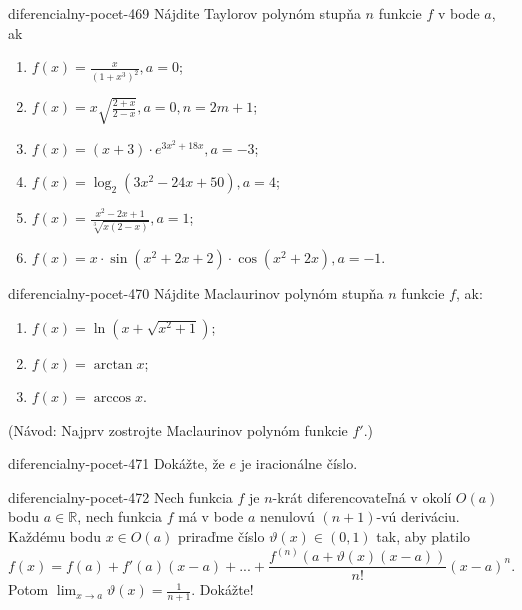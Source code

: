 \begin{defproblem}{diferencialny-pocet-469}
Nájdite Taylorov polynóm stupňa $n$ funkcie $f$ v bode $a$, ak
\begin{multicols}{2}
\begin{enumerate}
    \item $f(x)=\frac{x}{(1+x^3)^2},a=0$;
	\item $f(x)=x\sqrt{\frac{2+x}{2-x}},a=0,n=2m+1$;
	\item $f(x)=(x+3)\cdot e^{3x^2+18x},a=-3$;
	\item $f(x)=\log_2(3x^2-24x+50),a=4$;
	\item $f(x)=\frac{x^2-2x+1}{\sqrt[3]{x(2-x)}},a=1$;
	\item $f(x)=x\cdot\sin (x^2+2x+2)\cdot\cos (x^2+2x),a=-1$.
\end{enumerate}
\end{multicols}
\end{defproblem}

\begin{defproblem}{diferencialny-pocet-470}
Nájdite Maclaurinov polynóm stupňa $n$ funkcie $f$, ak:
\begin{multicols}{2}
\begin{enumerate}
	\item $f(x)=\ln (x+\sqrt{x^2+1})$;
	\item $f(x)=\arctan x$;
	\item $f(x)=\arccos x$.
\end{enumerate}
\end{multicols}
(Návod: Najprv zostrojte Maclaurinov polynóm funkcie $f'$.)
\end{defproblem}

\begin{defproblem}{diferencialny-pocet-471}
Dokážte, že $e$ je iracionálne číslo.
\end{defproblem}

\begin{defproblem}{diferencialny-pocet-472}
Nech funkcia $f$ je $n$-krát diferencovateľná v okolí $O(a)$ bodu $a\in\mathbb{R}$, nech funkcia $f$ má v bode $a$ nenulovú $(n+1)$-vú deriváciu. Každému bodu $x\in O(a)$ priraďme číslo $\vartheta (x)\in (0,1)$ tak, aby platilo
$$f(x)=f(a)+f'(a)(x-a)+...+\frac{f^{(n)}(a+\vartheta (x)(x-a))}{n!}(x-a)^n.$$
Potom $\lim_{x\rightarrow a}\vartheta (x)=\frac{1}{n+1}$. Dokážte!
\end{defproblem}

